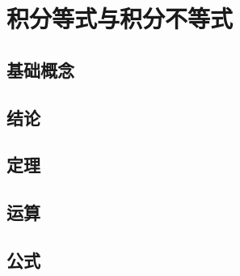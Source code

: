 \documentclass[a4paper,12pt]{article}
\begin{document}



    \section{积分等式与积分不等式}

    \subsection{基础概念}

    \begin{enumerate}
    \end{enumerate}

    \subsection{结论}

    \begin{enumerate}
    \end{enumerate}

    \subsection{定理}

    \begin{enumerate}
    \end{enumerate}

    \subsection{运算}

    \begin{enumerate}

    \end{enumerate}

    \subsection{公式}

    \begin{enumerate}

    \end{enumerate}
\end{document}
